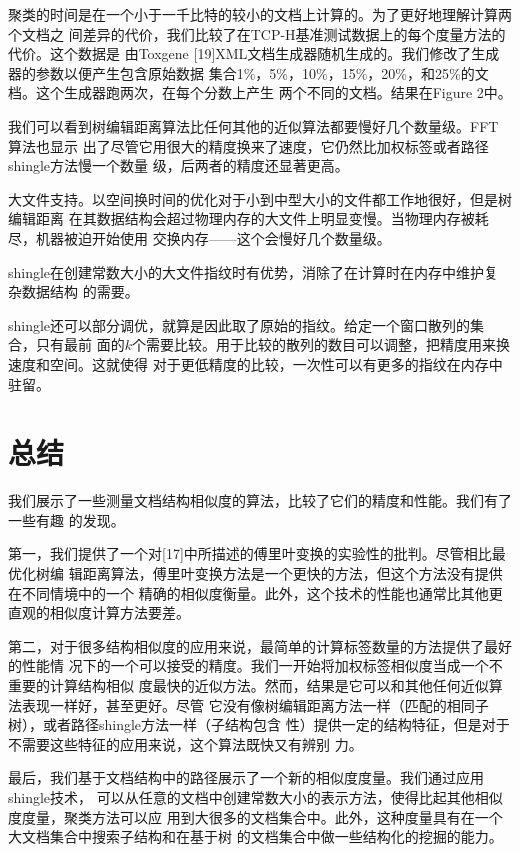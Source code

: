 聚类的时间是在一个小于一千比特的较小的文档上计算的。为了更好地理解计算两个文档之
间差异的代价，我们比较了在TCP-H基准测试数据上的每个度量方法的代价。这个数据是
由Toxgene [19]XML文档生成器随机生成的。我们修改了生成器的参数以便产生包含原始数据
集合1\%，5\%，10\%，15\%，20\%，和25\%的文档。这个生成器跑两次，在每个分数上产生
两个不同的文档。结果在Figure 2中。

我们可以看到树编辑距离算法比任何其他的近似算法都要慢好几个数量级。FFT算法也显示
出了尽管它用很大的精度换来了速度，它仍然比加权标签或者路径shingle方法慢一个数量
级，后两者的精度还显著更高。

大文件支持。以空间换时间的优化对于小到中型大小的文件都工作地很好，但是树编辑距离
在其数据结构会超过物理内存的大文件上明显变慢。当物理内存被耗尽，机器被迫开始使用
交换内存——这个会慢好几个数量级。

shingle在创建常数大小的大文件指纹时有优势，消除了在计算时在内存中维护复杂数据结构
的需要。

shingle还可以部分调优，就算是因此取了原始的指纹。给定一个窗口散列的集合，只有最前
面的$k$个需要比较。用于比较的散列的数目可以调整，把精度用来换速度和空间。这就使得
对于更低精度的比较，一次性可以有更多的指纹在内存中驻留。

\section{总结}
我们展示了一些测量文档结构相似度的算法，比较了它们的精度和性能。我们有了一些有趣
的发现。

第一，我们提供了一个对[17]中所描述的傅里叶变换的实验性的批判。尽管相比最优化树编
辑距离算法，傅里叶变换方法是一个更快的方法，但这个方法没有提供在不同情境中的一个
精确的相似度衡量。此外，这个技术的性能也通常比其他更直观的相似度计算方法要差。

第二，对于很多结构相似度的应用来说，最简单的计算标签数量的方法提供了最好的性能情
况下的一个可以接受的精度。我们一开始将加权标签相似度当成一个不重要的计算结构相似
度最快的近似方法。然而，结果是它可以和其他任何近似算法表现一样好，甚至更好。尽管
它没有像树编辑距离方法一样（匹配的相同子树），或者路径shingle方法一样（子结构包含
性）提供一定的结构特征，但是对于不需要这些特征的应用来说，这个算法既快又有辨别
力。

最后，我们基于文档结构中的路径展示了一个新的相似度度量。我们通过应用shingle技术，
可以从任意的文档中创建常数大小的表示方法，使得比起其他相似度度量，聚类方法可以应
用到大很多的文档集合中。此外，这种度量具有在一个大文档集合中搜索子结构和在基于树
的文档集合中做一些结构化的挖掘的能力。

